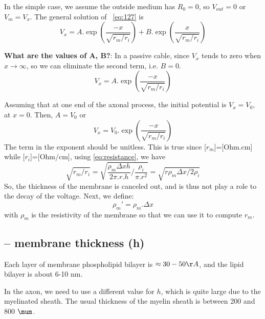 \begin{mdframed}[linecolor=red!60!black,  linewidth=2pt]
In the simple case, we assume the outside medium has 
$R_{0} = 0$, so $V_{out}= 0$ or $V_m = V_x$. 
The general solution of ~\eqref{eq:127} is
\begin{equation}
  V_x = A.\exp \left( \frac{-x}{\sqrt{r_m/r_i}} \right) +  B.\exp
  \left( \frac{x}{\sqrt{r_m/r_i}} \right)
\end{equation}


{\bf What are the values of A, B?}: In a passive cable, since $V_x$ tends to
zero when $x\rightarrow \infty$, so we can eliminate the second term,
i.e. $B=0$.
\begin{equation}
   V_x = A.\exp \left( \frac{-x}{\sqrt{r_m/r_i}} \right) 
\end{equation}

\end{mdframed}

Assuming that at one end of the axonal process, the initial potential
is $V_x = V_0$, at $x=0$. Then, $A = V_0$ or
\begin{equation}
  \label{eq:128}   V_x = V_0.\exp \left( \frac{-x}{\sqrt{r_m/r_i}} \right) 
\end{equation}
The term in the exponent should be unitless. This is true since
[$r_m$]=[Ohm.cm] while [$r_i$]=[Ohm/cm], using \eqref{eq:resistance},
we have
\begin{equation}
  \sqrt{r_m/r_i} = \sqrt{\frac{\rho_m\Delta
      x h}{2\pi.r.h}/\frac{\rho_i}{\pi.r^2}} = \sqrt{r\rho_m\Delta x/2\rho_i}
\end{equation}
So, the thickness of the membrane is canceled out, and is thus not play a role
to the decay of the voltage. Next, we define:
\begin{equation}\label{eq:rhom}
  \rho_m' = \rho_m. \Delta x
\end{equation}
with $\rho_m$ is the resistivity of the membrane so that we can use it
to compute $r_m$.


\subsection{-- membrane thickness (h)}
\label{sec:membrane-thickness}

Each layer of membrane phospholipid bilayer is $ \approx 30-50 \AA$, and the 
lipid bilayer is about 6-10 nm. 

In the axon, we need to use a different value for $h$, which is quite large due
to the myelinated sheath. The usual thickness of the myelin sheath is between
200 and 800 $\mum$.

